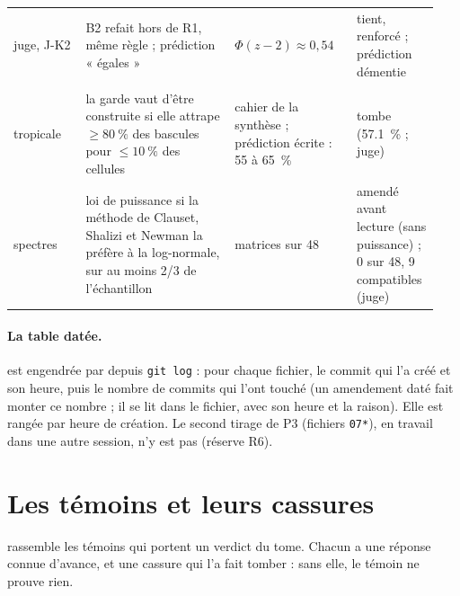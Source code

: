 \begin{longtable}{@{}>{\raggedright\arraybackslash}p{0.16\linewidth}>{\raggedright\arraybackslash}p{0.33\linewidth}>{\raggedright\arraybackslash}p{0.27\linewidth}>{\raggedright\arraybackslash}p{0.18\linewidth}@{}}
juge, J-K2 & B2 refait hors de R1, même règle ; prédiction « égales » & $\Phi(z - 2) \approx 0{,}54$ & tient, renforcé ; prédiction démentie \\
\multicolumn{4}{@{}l}{\textsf{\bfseries Les pistes (ch.~\ref{t3tro:ch} et~\ref{t3spe:ch})}} \\
tropicale & la garde vaut d'être construite si elle attrape $\ge \SI{80}{\percent}$ des bascules pour $\le \SI{10}{\percent}$ des cellules & cahier de la synthèse ; prédiction écrite : 55 à \SI{65}{\percent} & tombe (\SI{57.1}{\percent} ; juge) \\
spectres & loi de puissance si la méthode de Clauset, Shalizi et Newman la préfère à la log-normale, sur au moins 2/3 de l'échantillon & 32 matrices sur 48 & amendé avant lecture (sans puissance) ; 0 sur 48, 9 compatibles (juge) \\
\bottomrule
\end{longtable}
\endgroup

\paragraph{La table datée.}  est engendrée par  depuis \texttt{git log} : pour chaque fichier, le commit qui l'a créé et son heure, puis le nombre de commits qui l'ont touché (un amendement daté fait monter ce nombre ; il se lit dans le fichier, avec son heure et la raison). Elle est rangée par heure de création. Le second tirage de P3 (fichiers \texttt{07*}), en travail dans une autre session, n'y est pas (réserve R6).



\section{Les témoins et leurs cassures}\label{t3ann:sec:temoins}

 rassemble les témoins qui portent un verdict du tome. Chacun a une réponse connue d'avance, et une cassure qui l'a fait tomber : sans elle, le témoin ne prouve rien.

